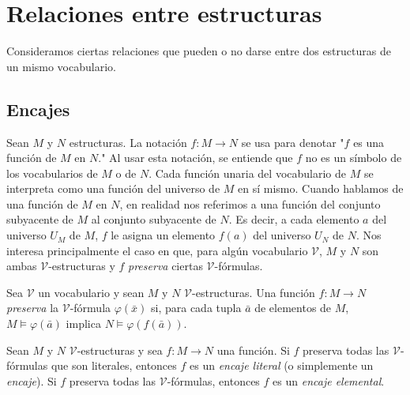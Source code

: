 \message{ !name(main.tex)}\documentclass[12pt,a4paper]{book}
\newcommand{\comillas}[1]{"#1"}
\newcommand{\VV}{\mathcal{V}}
\begin{document}
    \section{Relaciones entre estructuras}

    Consideramos ciertas relaciones que pueden o no darse entre dos estructuras de un mismo vocabulario.

    \subsection{Encajes}

    Sean $M$ y $N$ estructuras. La notación $f:M\rightarrow N$ se usa para denotar \comillas{$f$ es una función de $M$ en
    $N$.} Al usar esta notación, se entiende que $f$ no es un símbolo de los vocabularios de $M$ o de $N$. Cada función
    unaria del vocabulario de $M$ se interpreta como una función del universo de $M$ en sí mismo. Cuando hablamos de una
    función de $M$ en $N$, en realidad nos referimos a una función del conjunto subyacente de $M$ al conjunto subyacente de
    $N$. Es decir, a cada elemento $a$ del universo $U_{M}$ de $M$, $f$ le asigna un elemento $f(a)$ del universo $U_{N}$ de
    $N$. Nos interesa principalmente el caso en que, para algún vocabulario $\VV$, $M$ y $N$ son ambas $\VV$-estructuras y
    $f$ \textit{preserva} ciertas $\VV$-fórmulas.

    \begin{definicion}[Preservación]\label{def:preserva-formula}
        Sea $\VV$ un vocabulario y sean $M$ y $N$ $\VV$-estructuras. Una función $f:M\rightarrow N$ \textit{preserva} la
        $\VV$-fórmula $\varphi(\bar{x})$ si, para cada tupla $\bar{a}$ de elementos de $M$, $M\models\varphi(\bar{a})$
        implica $N\models\varphi(f(\bar{a}))$.
    \end{definicion}

    \begin{definicion}[Encaje]\label{def:encaje-literal-elemental}
        Sean $M$ y $N$ $\VV$-estructuras y sea $f:M\rightarrow N$ una función. Si $f$ preserva todas las $\VV$-fórmulas
        que son literales, entonces $f$ es un \textit{encaje literal} (o simplemente un \textit{encaje}). Si $f$ preserva
        todas las $\VV$-fórmulas, entonces $f$ es un \textit{encaje elemental}.
    \end{definicion}
\end{document}
